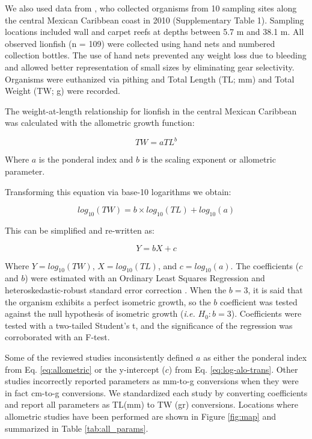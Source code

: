 \documentclass[fleqn,10pt,lineno]{wlpeerj} %
\begin{document}
We also used data from \citet{villaseorderbez_2014}, who collected
organisms from 10 sampling sites along the central Mexican Caribbean
coast in 2010 (Supplementary Table 1). Sampling locations included wall
and carpet reefs at depths between 5.7 m and 38.1 m. All observed
lionfish (n = 109) were collected using hand nets and numbered
collection bottles. The use of hand nets prevented any weight loss due
to bleeding and allowed better representation of small sizes by
eliminating gear selectivity. Organisms were euthanized via pithing and
Total Length (TL; mm) and Total Weight (TW; g) were recorded.

The weight-at-length relationship for lionfish in the central Mexican
Caribbean was calculated with the allometric growth function:

\begin{equation}
\label{eq:allometric}
TW = aTL^b
\end{equation}

Where \(a\) is the ponderal index and \(b\) is the scaling exponent or
allometric parameter.

\clearpage

Transforming this equation via base-10 logarithms we obtain:

\begin{equation}
\label{eq:log-alo}
log_{10}(TW) = b\times log_{10}(TL) + log_{10}(a)
\end{equation}

This can be simplified and re-written as:

\begin{equation}
\label{eq:log-alo-trans}
Y = bX + c
\end{equation}

Where \(Y = log_{10}(TW)\), \(X = log_{10}(TL)\), and
\(c = log_{10}(a)\). The coefficients (\(c\) and \(b\)) were estimated
with an Ordinary Least Squares Regression and heteroskedastic-robust
standard error correction \citep{zeileis_2004}. When the \(b = 3\), it
is said that the organism exhibits a perfect isometric growth, so the
\(b\) coefficient was tested against the null hypothesis of isometric
growth (\emph{i.e.} \(H_0: b = 3\)). Coefficients were tested with a
two-tailed Student's t, and the significance of the regression was
corroborated with an F-test.

Some of the reviewed studies inconsistently defined \(a\) as either the
ponderal index from Eq. \ref{eq:allometric} or the y-intercept (\(c\))
from Eq. \ref{eq:log-alo-trans}. Other studies incorrectly reported
parameters as mm-to-g conversions when they were in fact cm-to-g
conversions. We standardized each study by converting coefficients and
report all parameters as TL(mm) to TW (gr) conversions. Locations where
allometric studies have been performed are shown in Figure \ref{fig:map}
and summarized in Table \ref{tab:all_params}.
\end{document}
